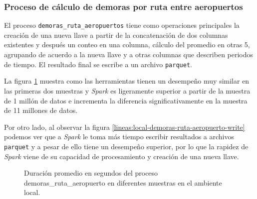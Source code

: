 \subsubsection{Proceso de cálculo de demoras por ruta entre aeropuertos}

El proceso \texttt{demoras\_ruta\_aeropuertos} tiene como operaciones principales  la creación de una nueva llave a partir de la concatenación de dos columnas existentes y después un conteo en una columna, cálculo del promedio en otras 5, agrupando de acuerdo a la nueva llave y a otras columnas que describen periodos de tiempo. El resultado final se escribe a un archivo \texttt{parquet}.

La figura \ref{lineas:local-demoras-ruta-aeropuerto} muestra como las herramientas tienen un desempeño muy similar en las primeras dos muestras y \textit{Spark} es ligeramente superior a partir de la muestra de 1 millón de datos e incrementa la diferencia significativamente en la muestra de 11 millones de datos. 

Por otro lado, al observar la figura \ref{lineas:local-demoras-ruta-aeropuerto-write} podemos ver que a \textit{Spark} le toma más tiempo escribir resultados a archivos \texttt{parquet} y a pesar de ello tiene un desempeño superior, por lo que la rapidez de \textit{Spark} viene de su capacidad de procesamiento y creación de una nueva llave.

\begin{figure}
\centering
{}
\caption{Duración promedio en segundos del proceso demoras\_ruta\_aeropuerto en diferentes muestras en el ambiente local.}
\label{lineas:local-demoras-ruta-aeropuerto}
\end{figure}

